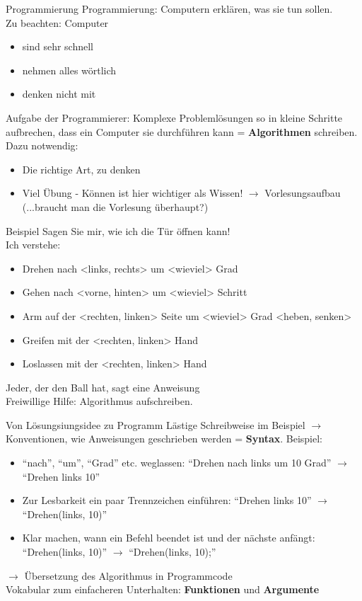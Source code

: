 \documentclass[aspectratio=169,t]{beamer}
\begin{document}
\begin{frame}{Programmierung}
	Programmierung: Computern erklären, was sie tun sollen. \\Zu beachten: Computer
	\begin{itemize}
		\item sind sehr schnell
		\item nehmen alles wörtlich
		\item denken nicht mit
	\end{itemize}
	Aufgabe der Programmierer: Komplexe Problemlösungen so in kleine Schritte aufbrechen, dass ein Computer sie durchführen kann = \textbf{Algorithmen} schreiben.\\
	Dazu notwendig:
	\begin{itemize}
		\item Die richtige Art, zu denken
		\item Viel Übung - Können ist hier wichtiger als Wissen! $\rightarrow$ Vorlesungsaufbau (...braucht man die Vorlesung überhaupt?)
	\end{itemize}
\end{frame}

\begin{frame}{Beispiel}
	Sagen Sie mir, wie ich die Tür öffnen kann!\\Ich verstehe:
	\begin{itemize}
		\item Drehen nach <links, rechts> um <wieviel> Grad
		\item Gehen nach <vorne, hinten> um <wieviel> Schritt
		\item Arm auf der <rechten, linken> Seite um <wieviel> Grad <heben, senken>
		\item Greifen mit der <rechten, linken> Hand
		\item Loslassen mit der <rechten, linken> Hand
	\end{itemize}
	Jeder, der den Ball hat, sagt eine Anweisung\\Freiwillige Hilfe: Algorithmus aufschreiben.
\end{frame}

\begin{frame}{Von Lösungsiungsidee zu Programm}
	Lästige Schreibweise im Beispiel $\rightarrow$ Konventionen, wie Anweisungen geschrieben werden = \textbf{Syntax}. Beispiel:
	\begin{itemize}
		\item ``nach'', ``um'', ``Grad'' etc. weglassen: ``Drehen nach links um 10 Grad'' $\rightarrow$ ``Drehen links 10''
		\item Zur Lesbarkeit ein paar Trennzeichen einführen: ``Drehen links 10'' $\rightarrow$ ``Drehen(links, 10)''
		\item Klar machen, wann ein Befehl beendet ist und der nächste anfängt: ``Drehen(links, 10)'' $\rightarrow$ ``Drehen(links, 10);''
	\end{itemize}
	$\rightarrow$ Übersetzung des Algorithmus in Programmcode
	\\Vokabular zum einfacheren Unterhalten: \textbf{Funktionen} und \textbf{Argumente}
\end{frame}
\end{document}
